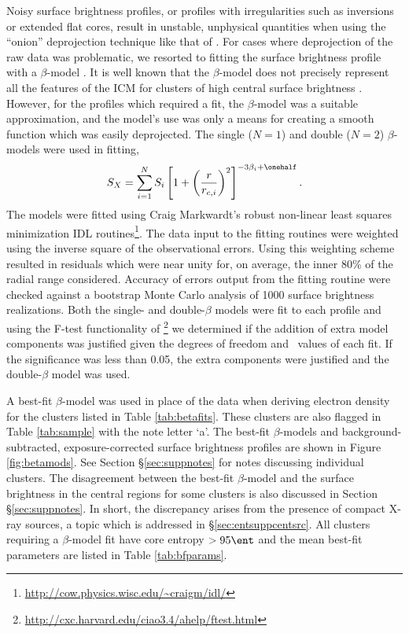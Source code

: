 Noisy surface brightness profiles, or profiles with irregularities
such as inversions or extended flat cores, result in unstable,
unphysical quantities when using the ``onion'' deprojection technique
like that of \citet{kriss83}. For cases where deprojection of the raw
data was problematic, we resorted to fitting the surface brightness
profile with a $\beta$-model \citep{1978A&A....70..677C}. It is well
known that the $\beta$-model does not precisely represent all the
features of the ICM for clusters of high central surface brightness
\citep{2000MNRAS.311..313E, 2002ApJ...579..571L,
2007ApJ...665..911H}. However, for the profiles which required a fit,
the $\beta$-model was a suitable approximation, and the model's use was
only a means for creating a smooth function which was easily
deprojected. The single ($N=1$) and double ($N=2$) $\beta$-models were
used in fitting,
\begin{equation}
S_X = \displaystyle\sum_{i=1}^N S_i \left[1+\left(\frac{r}{r_{c,i}}\right)^2\right]^{-3\beta_i+\onehalf}.
\end{equation}
The models were fitted using Craig Markwardt's robust non-linear least
squares minimization IDL
routines\footnote{\url{http://cow.physics.wisc.edu/~craigm/idl/}}. The
data input to the fitting routines were weighted using the inverse
square of the observational errors. Using this weighting scheme
resulted in residuals which were near unity for, on average, the inner
80\% of the radial range considered. Accuracy of errors output from
the fitting routine were checked against a bootstrap Monte Carlo
analysis of 1000 surface brightness realizations. Both the single- and
double-$\beta$ models were fit to each profile and using the F-test
functionality of
\sherpa\footnote{\url{http://cxc.harvard.edu/ciao3.4/ahelp/ftest.html}}
we determined if the addition of extra model components was justified
given the degrees of freedom and \chisq\ values of each fit. If the
significance was less than 0.05, the extra components were justified
and the double-$\beta$ model was used.

A best-fit $\beta$-model was used in place of the data when deriving
electron density for the clusters listed in Table
\ref{tab:betafits}. These clusters are also flagged in Table
\ref{tab:sample} with the note letter `a'. The best-fit $\beta$-models
and background-subtracted, exposure-corrected surface brightness
profiles are shown in Figure \ref{fig:betamods}. See Section
\S\ref{sec:suppnotes} for notes discussing individual clusters. The
disagreement between the best-fit $\beta$-model and the surface
brightness in the central regions for some clusters is also discussed
in Section \S\ref{sec:suppnotes}. In short, the discrepancy arises
from the presence of compact X-ray sources, a topic which is addressed
in \S\ref{sec:entsuppcentsrc}. All clusters requiring a $\beta$-model
fit have core entropy $> 95 \ent$ and the mean best-fit parameters are
listed in Table \ref{tab:bfparams}.

